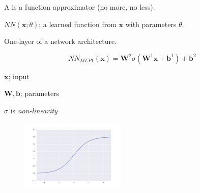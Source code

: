 \documentclass{beamer}
\let\tempone\itemize
\let\temptwo\enditemize
\renewenvironment{itemize}{\tempone\addtolength{\itemsep}{0.5\baselineskip}}{\temptwo}
\newcommand{\boldx}{\mathbf{x}}
\newcommand{\boldb}{\mathbf{b}}
\newcommand{\boldW}{\mathbf{W}}
\newcommand{\reals}{\ensuremath{\mathbb{R}}}
\begin{document}
\begin{frame}
  A  is a \alert{function approximator} (no more, no less). 

  
  \begin{itemize}
  \item  $NN(\boldx; \theta)$; a learned function from $\boldx$ with parameters $\theta$.
  \end{itemize}

  \pause
  One-layer of a network architecture.

  \[NN_{MLP1}(\boldx) =  \boldW^2 \sigma(\boldW^1 \boldx + \boldb^1) + \boldb^2\]
  \begin{itemize}
  \item $\boldx$; input

  \item $\boldW, \boldb$; parameters
  \item $\sigma$ is \textit{non-linearity} 
  \end{itemize}
  \begin{figure}
    \centering
    \includegraphics[width=5cm]{sigmoid}     
  \end{figure}

\end{frame}

\end{document}
